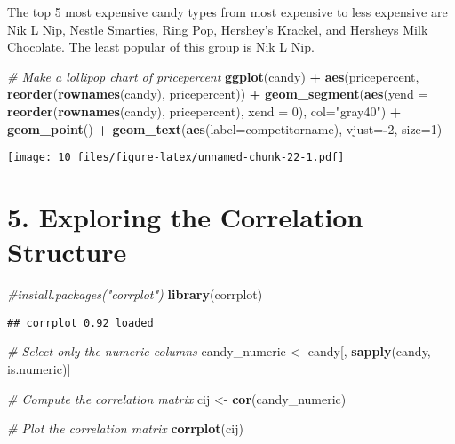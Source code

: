 \documentclass[
]{article}
\newenvironment{Shaded}{\begin{snugshade}}{\end{snugshade}}
\newcommand{\AttributeTok}[1]{\textcolor[rgb]{0.13,0.29,0.53}{#1}}
\newcommand{\CommentTok}[1]{\textcolor[rgb]{0.56,0.35,0.01}{\textit{#1}}}
\newcommand{\DecValTok}[1]{\textcolor[rgb]{0.00,0.00,0.81}{#1}}
\newcommand{\FunctionTok}[1]{\textcolor[rgb]{0.13,0.29,0.53}{\textbf{#1}}}
\newcommand{\NormalTok}[1]{#1}
\newcommand{\OtherTok}[1]{\textcolor[rgb]{0.56,0.35,0.01}{#1}}
\newcommand{\SpecialCharTok}[1]{\textcolor[rgb]{0.81,0.36,0.00}{\textbf{#1}}}
\newcommand{\StringTok}[1]{\textcolor[rgb]{0.31,0.60,0.02}{#1}}
\begin{document}
The top 5 most expensive candy types from most expensive to less
expensive are Nik L Nip, Nestle Smarties, Ring Pop, Hershey's Krackel,
and Hersheys Milk Chocolate. The least popular of this group is Nik L
Nip.

\begin{Shaded}
\begin{Highlighting}[]
\CommentTok{\# Make a lollipop chart of pricepercent}
\FunctionTok{ggplot}\NormalTok{(candy) }\SpecialCharTok{+}
  \FunctionTok{aes}\NormalTok{(pricepercent, }\FunctionTok{reorder}\NormalTok{(}\FunctionTok{rownames}\NormalTok{(candy), pricepercent)) }\SpecialCharTok{+}
  \FunctionTok{geom\_segment}\NormalTok{(}\FunctionTok{aes}\NormalTok{(}\AttributeTok{yend =} \FunctionTok{reorder}\NormalTok{(}\FunctionTok{rownames}\NormalTok{(candy), pricepercent), }
                   \AttributeTok{xend =} \DecValTok{0}\NormalTok{), }\AttributeTok{col=}\StringTok{"gray40"}\NormalTok{) }\SpecialCharTok{+}
    \FunctionTok{geom\_point}\NormalTok{() }\SpecialCharTok{+} \FunctionTok{geom\_text}\NormalTok{(}\FunctionTok{aes}\NormalTok{(}\AttributeTok{label=}\NormalTok{competitorname), }\AttributeTok{vjust=}\SpecialCharTok{{-}}\DecValTok{2}\NormalTok{, }\AttributeTok{size=}\DecValTok{1}\NormalTok{) }
\end{Highlighting}
\end{Shaded}

\texttt{[image: 10\_files/figure-latex/unnamed-chunk-22-1.pdf]}

\hypertarget{exploring-the-correlation-structure}{%
\section{5. Exploring the Correlation
Structure}\label{exploring-the-correlation-structure}}

\begin{Shaded}
\begin{Highlighting}[]
\CommentTok{\#install.packages("corrplot")}
\FunctionTok{library}\NormalTok{(corrplot)}
\end{Highlighting}
\end{Shaded}

\begin{verbatim}
## corrplot 0.92 loaded
\end{verbatim}

\begin{Shaded}
\begin{Highlighting}[]
\CommentTok{\# Select only the numeric columns}
\NormalTok{candy\_numeric }\OtherTok{\textless{}{-}}\NormalTok{ candy[, }\FunctionTok{sapply}\NormalTok{(candy, is.numeric)]}

\CommentTok{\# Compute the correlation matrix}
\NormalTok{cij }\OtherTok{\textless{}{-}} \FunctionTok{cor}\NormalTok{(candy\_numeric)}

\CommentTok{\# Plot the correlation matrix}
\FunctionTok{corrplot}\NormalTok{(cij)}
\end{Highlighting}
\end{Shaded}
\end{document}
